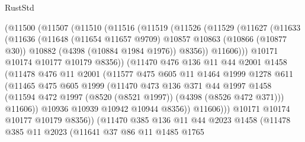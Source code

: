 \begin{lexlean}{RustStd}
\begin{coremodule}
            (@11500
              (@11507
                (@11510
                  (@11516
                    (@11519
                      (@11526
                        (@11529
                          (@11627
                            (@11633
                              (@11636
                                (@11648
                                  (@11654 @11657 @9709)
                                  @10857
                                  @10863
                                  (@10866 (@10877 @30))
                                  @10882
                                  (@4398 (@10884 @1984 @1976))
                                  @8356))
                              @11606)))
                        @10171
                        @10174
                        @10177
                        @10179
                        @8356))
                    (@11470
                      @476
                      @136
                      @11
                      @44
                      @2001
                      @1458
                      (@11478
                        @476
                        @11
                        @2001
                        (@11577
                          @475
                          @605
                          @11
                          @1464
                          @1999
                          @1278
                          @611
                          (@11465
                            @475
                            @605
                            @1999
                            (@11470
                              @473
                              @136
                              @371
                              @44
                              @1997
                              @1458
                              (@11594 @472 @1997 (@8520 (@8521 @1997)) (@4398 (@8526 @472 @371)))
                              @11606))
                          @10936
                          @10939
                          @10942
                          @10944
                          @8356))
                      @11606)))
                @10171
                @10174
                @10177
                @10179
                @8356))
            (@11470
              @385
              @136
              @11
              @44
              @2023
              @1458
              (@11478
                @385
                @11
                @2023
                (@11641
                  @37
                  @86
                  @11
                  @1485
                  @1765

\end{coremodule}
\end{lexlean}

